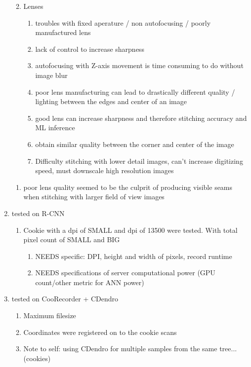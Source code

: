 \documentclass{article}
\begin{document}
\begin{outline}[enumerate]
\begin{enumerate}
\begin{enumerate}
\begin {enumerate}
			\end{enumerate}
			\item Lenses
			\begin{enumerate}
				\item troubles with fixed aperature / non autofocusing / poorly manufactured lens
				\item lack of control to increase sharpness
				\item autofocusing with Z-axis movement is time consuming to do without image blur
				\item poor lens manufacturing can lead to drastically different quality / lighting between the edges and center of an image
				\item good lens can increase sharpness and therefore stitching accuracy and ML inference
				\item obtain similar quality between the corner and center of the image
				\item Difficulty stitching with lower detail images, can't increase digitizing speed, must downscale high resolution images 
				\end{enumerate}
		\end{enumerate}
		\begin{enumerate}
		\item poor lens quality seemed to be the culprit of producing visible seams when stitching with larger field of view images 
		\end{enumerate}
	\item tested on R-CNN
		\begin{enumerate}
		\item Cookie with a dpi of SMALL and dpi of 13500 were tested. With total pixel count of SMALL and BIG
			\begin{enumerate}
			\item NEEDS specific: DPI, height and width of pixels, record runtime
			\item NEEDS specifications of server computational power (GPU count/other metric for ANN power)
			\end{enumerate}
		\end{enumerate}
	\item tested on CooRecorder + CDendro
		\begin{enumerate}
		\item Maximum filesize 
		\item Coordinates were registered on to the cookie scans 
		\item Note to self: using CDendro for multiple samples from the same tree... (cookies) 

\end{enumerate}
\end{enumerate}
\end{outline}
\end{document}
